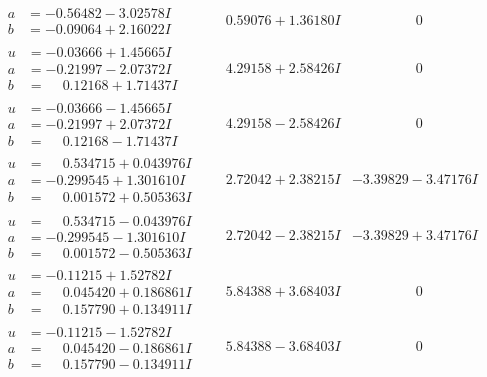 \documentclass[1p]{elsarticle_modified}
\theoremstyle{definition}
\begin{document}
$$\begin{array}{c|c|c}
\begin{aligned}
a &= -0.56482 - 3.02578 I \\
b &= -0.09064 + 2.16022 I\end{aligned}
 & \phantom{-}0.59076 + 1.36180 I & \phantom{-0.000000 } 0 \\ \hline\begin{aligned}
u &= -0.03666 + 1.45665 I \\
a &= -0.21997 - 2.07372 I \\
b &= \phantom{-}0.12168 + 1.71437 I\end{aligned}
 & \phantom{-}4.29158 + 2.58426 I & \phantom{-0.000000 } 0 \\ \hline\begin{aligned}
u &= -0.03666 - 1.45665 I \\
a &= -0.21997 + 2.07372 I \\
b &= \phantom{-}0.12168 - 1.71437 I\end{aligned}
 & \phantom{-}4.29158 - 2.58426 I & \phantom{-0.000000 } 0 \\ \hline\begin{aligned}
u &= \phantom{-}0.534715 + 0.043976 I \\
a &= -0.299545 + 1.301610 I \\
b &= \phantom{-}0.001572 + 0.505363 I\end{aligned}
 & \phantom{-}2.72042 + 2.38215 I & -3.39829 - 3.47176 I \\ \hline\begin{aligned}
u &= \phantom{-}0.534715 - 0.043976 I \\
a &= -0.299545 - 1.301610 I \\
b &= \phantom{-}0.001572 - 0.505363 I\end{aligned}
 & \phantom{-}2.72042 - 2.38215 I & -3.39829 + 3.47176 I \\ \hline\begin{aligned}
u &= -0.11215 + 1.52782 I \\
a &= \phantom{-}0.045420 + 0.186861 I \\
b &= \phantom{-}0.157790 + 0.134911 I\end{aligned}
 & \phantom{-}5.84388 + 3.68403 I & \phantom{-0.000000 } 0 \\ \hline\begin{aligned}
u &= -0.11215 - 1.52782 I \\
a &= \phantom{-}0.045420 - 0.186861 I \\
b &= \phantom{-}0.157790 - 0.134911 I\end{aligned}
 & \phantom{-}5.84388 - 3.68403 I & \phantom{-0.000000 } 0\\

\end{array}$$
\end{document}
